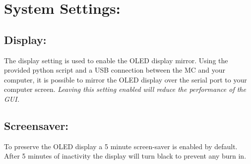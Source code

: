\chapter{System Settings:}

\section{Display:}
The display setting is used to enable the OLED display mirror. Using the provided python script and a USB connection between the MC and your computer, it is possible to mirror the OLED display over the serial port to your computer screen.
\textit{Leaving this setting enabled will reduce the performance of the GUI.}
\section{Screensaver:}
To preserve the OLED display a 5 minute screen-saver is enabled by default. After 5 minutes of inactivity the display will turn black to prevent any burn in.